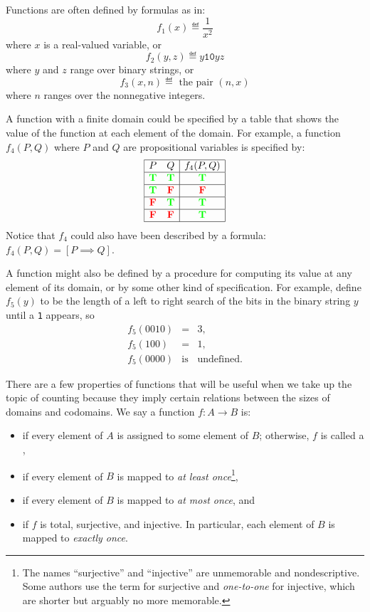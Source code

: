 Functions are often defined by formulas as in:
\[
f_1(x) \eqdef \frac{1}{x^2}
\]
where $x$ is a real-valued variable, or
\[
f_2(y,z) \eqdef y\mathtt{10}yz
\]
where $y$ and $z$ range over binary strings, or
\[
f_3(x, n) \eqdef \text{ the pair } (n, x)
\]
where $n$ ranges over the nonnegative integers.

A function with a finite domain could be specified by a table that shows
the value of the function at each element of the domain.  For example, a function
$f_4(P,Q)$ where $P$ and $Q$ are propositional variables is specified by:
\[\begin{array}{|cc|c|}
\hline
P & Q & f_4(P,Q)\\
\hline \textcolor{green}{\mathbf{T}} & \textcolor{green}{\mathbf{T}} & \textcolor{green}{\mathbf{T}}\\
\hline \textcolor{green}{\mathbf{T}} & \textcolor{red}{\mathbf{F}} & \textcolor{red}{\mathbf{F}}\\
\hline \textcolor{red}{\mathbf{F}} & \textcolor{green}{\mathbf{T}} & \textcolor{green}{\mathbf{T}}\\
\hline \textcolor{red}{\mathbf{F}} & \textcolor{red}{\mathbf{F}} & \textcolor{green}{\mathbf{T}}\\
\hline
\end{array}\]
Notice that $f_4$ could also have been described by a formula: $f_4(P,Q) =
[P \implies Q]$.

A function might also be defined by a procedure for computing its value at
any element of its domain, or by some other kind of specification.  For
example, define $f_5(y)$ to be the length of a left to right search of the
bits in the binary string $y$ until a \texttt{1} appears, so
\begin{eqnarray*}
f_5(0010) & = &  3,\\
f_5(100)  & = & 1,\\
f_5(0000) & \text{is} & \text{undefined}.
\end{eqnarray*}
\iffalse
Operations include function inverse and composition ($f \circ g(x) =
f(g(x))$).
\fi

There are a few properties of functions that will be useful when we take up
the topic of counting because they imply certain relations between the
sizes of domains and codomains.  We say a function $f : A \to B$ is:

\begin{itemize}

\item {} if every element of $A$ is assigned to some element of
  $B$; otherwise, $f$ is called a ,

\item {} if every element of $B$ is mapped to \textit{at
least once}\footnote{
The names ``surjective'' and ``injective'' are unmemorable and
nondescriptive.  Some authors use the term  for surjective and
\emph{one-to-one} for injective, which are shorter but arguably no more
memorable.}, %

\item {} if every element of $B$ is mapped to \textit{at
most once}, and

\item {} if $f$ is total, surjective, and injective.  In
  particular, each element of $B$ is mapped to \emph{exactly once}.

\end{itemize}

